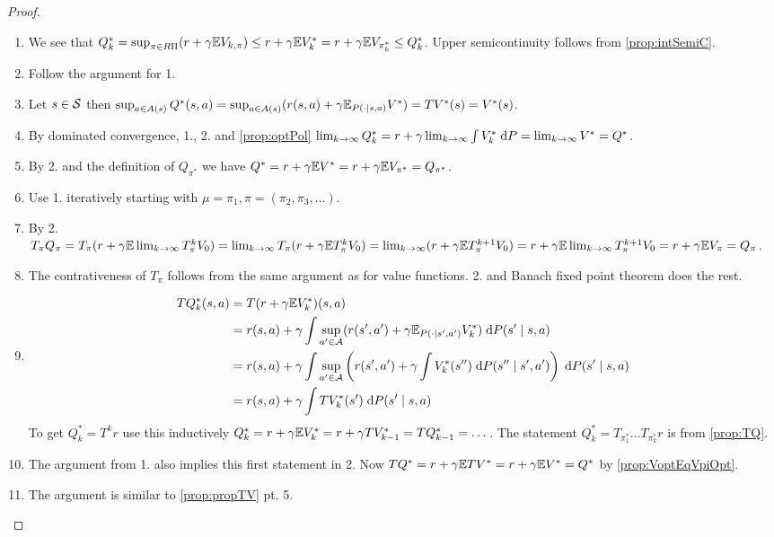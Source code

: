 \begin{proof} %
  \leavevmode
  \begin{enumerate}
    \item We see that
      $Q_k^* = \sup_{\pi \in R\Pi} (r + \gamma \mathbb{E} V_{k,\pi})
      \leq r + \gamma \mathbb{E} V_k^* = r + \gamma \mathbb{E} V_{\pi_k^*}
      \leq Q_k^*$.
      Upper semicontinuity follows from \cref{prop:intSemiC}.
    \item Follow the argument for 1.
    \item Let $s \in \mathcal{S}$ then $\sup_{a \in A(s)} Q^*(s, a) = 
      \sup_{a \in A(s)} (r(s, a) + \gamma \mathbb{E}_{P(\cdot \mid s, a)} V^*)
      = T V^*(s) = V^*(s)$.
    \item By dominated convergence, 1., 2. and \cref{prop:optPol}
      $\lim_{k\to\infty} Q^*_k = r + \gamma \lim_{k\to\infty} \int V^*_k
      \; \mathrm{d} P = \lim_{k\to\infty} V^* = Q^*$.
    \item By 2. and the definition of $Q_{\pi^*}$ we have
      $Q^* = r + \gamma \mathbb{E} V^* = r + \gamma \mathbb{E} V_{\pi^*} = Q_{\pi^*}$.
    \item Use 1. iteratively starting with
      $\mu = \pi_1, \pi = (\pi_2, \pi_3, \dots)$.
    \item By 2. $T_\pi Q_\pi = T_\pi (r + \gamma \mathbb{E} \lim_{k\to\infty} T_\pi^k V_0)
      = \lim_{k\to\infty} T_\pi (r + \gamma \mathbb{E} T_\pi^k V_0)
      = \lim_{k\to\infty} (r + \gamma \mathbb{E} T_\pi^{k+1} V_0)
      = r + \gamma \mathbb{E} \lim_{k\to\infty} T^{k+1}_\pi V_0
      = r + \gamma \mathbb{E} V_\pi = Q_\pi$.
    \item The contrativeness of $T_\pi$ follows from the same argument as for
      value functions. 2. and Banach fixed point theorem does the rest.
    \item \begin{align*}
	TQ^*_k(s,a) &= T(r + \gamma \mathbb{E} V^*_k)(s,a)
	\\ &= r(s,a) + \gamma
	\int \sup_{a' \in \mathcal{A}} (r(s',a')
	+ \gamma \mathbb{E}_{P(\cdot \mid s', a')} V^*_k)
	\; \mathrm{d} P(s' \mid s,a)
	\\ &=r(s,a) + \gamma
	\int \sup_{a' \in \mathcal{A}} \left(r(s',a') + \gamma
	\int V_k^*(s'') \; \mathrm{d} P(s'' \mid s', a') \right)
	\; \mathrm{d} P(s' \mid s,a)
	\\ &= r(s, a) + \gamma
	\int T V^*_k(s') \; \mathrm{d} P(s' \mid s, a)
      \end{align*}
      To get $Q^*_k = T^k r$ use this inductively
      $Q^*_k = r + \gamma \mathbb{E} V^*_k = r+ \gamma TV^*_{k-1}
      = T Q^*_{k-1} = \dots$.
      The statement $Q^*_k = T_{\pi^*_1} \dots T_{\pi^*_k} r$
      is from \cref{prop:TQ}.
    \item The argument from 1. also implies this first statement in
      2. Now $TQ^* = r + \gamma \mathbb{E} TV^* = r + \gamma \mathbb{E} V^* = Q^*$
      by \cref{prop:VoptEqVpiOpt}.
    \item The argument is similar to \cref{prop:propTV} pt. 5.
  \end{enumerate}
\end{proof}

